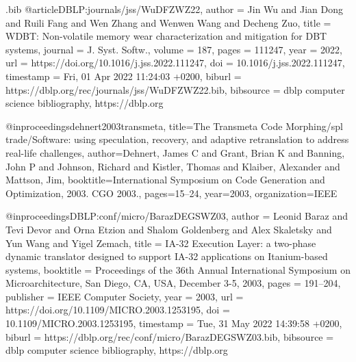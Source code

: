 \begin{filecontents}{\jobname.bib}
@article{DBLP:journals/jss/WuDFZWZ22,
  author       = {Jin Wu and
                  Jian Dong and
                  Ruili Fang and
                  Wen Zhang and
                  Wenwen Wang and
                  Decheng Zuo},
  title        = {{WDBT:} Non-volatile memory wear characterization and mitigation for
                  {DBT} systems},
  journal      = {J. Syst. Softw.},
  volume       = {187},
  pages        = {111247},
  year         = {2022},
  url          = {https://doi.org/10.1016/j.jss.2022.111247},
  doi          = {10.1016/j.jss.2022.111247},
  timestamp    = {Fri, 01 Apr 2022 11:24:03 +0200},
  biburl       = {https://dblp.org/rec/journals/jss/WuDFZWZ22.bib},
  bibsource    = {dblp computer science bibliography, https://dblp.org}
}

@inproceedings{dehnert2003transmeta,
  title={The Transmeta Code Morphing/spl trade/Software: using speculation, recovery, and adaptive retranslation to address real-life challenges},
  author={Dehnert, James C and Grant, Brian K and Banning, John P and Johnson, Richard and Kistler, Thomas and Klaiber, Alexander and Mattson, Jim},
  booktitle={International Symposium on Code Generation and Optimization, 2003. CGO 2003.},
  pages={15--24},
  year={2003},
  organization={IEEE}
}

@inproceedings{DBLP:conf/micro/BarazDEGSWZ03,
  author       = {Leonid Baraz and
                  Tevi Devor and
                  Orna Etzion and
                  Shalom Goldenberg and
                  Alex Skaletsky and
                  Yun Wang and
                  Yigel Zemach},
  title        = {{IA-32} Execution Layer: a two-phase dynamic translator designed to
                  support {IA-32} applications on Itanium-based systems},
  booktitle    = {Proceedings of the 36th Annual International Symposium on Microarchitecture,
                  San Diego, CA, USA, December 3-5, 2003},
  pages        = {191--204},
  publisher    = {{IEEE} Computer Society},
  year         = {2003},
  url          = {https://doi.org/10.1109/MICRO.2003.1253195},
  doi          = {10.1109/MICRO.2003.1253195},
  timestamp    = {Tue, 31 May 2022 14:39:58 +0200},
  biburl       = {https://dblp.org/rec/conf/micro/BarazDEGSWZ03.bib},
  bibsource    = {dblp computer science bibliography, https://dblp.org}
}


\end{filecontents}
